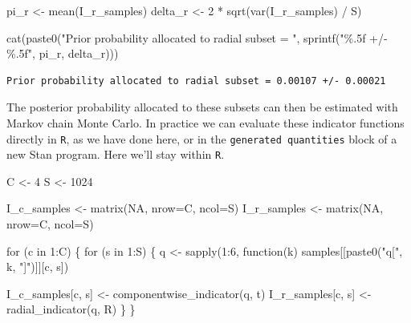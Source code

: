 \documentclass[
  letterpaper,
  DIV=11,
  numbers=noendperiod]{scrartcl}
\newenvironment{Shaded}{\begin{snugshade}}{\end{snugshade}}
\newcommand{\AttributeTok}[1]{\textcolor[rgb]{0.40,0.45,0.13}{#1}}
\newcommand{\ConstantTok}[1]{\textcolor[rgb]{0.56,0.35,0.01}{#1}}
\newcommand{\ControlFlowTok}[1]{\textcolor[rgb]{0.00,0.23,0.31}{#1}}
\newcommand{\DecValTok}[1]{\textcolor[rgb]{0.68,0.00,0.00}{#1}}
\newcommand{\FunctionTok}[1]{\textcolor[rgb]{0.28,0.35,0.67}{#1}}
\newcommand{\NormalTok}[1]{\textcolor[rgb]{0.00,0.23,0.31}{#1}}
\newcommand{\OtherTok}[1]{\textcolor[rgb]{0.00,0.23,0.31}{#1}}
\newcommand{\SpecialCharTok}[1]{\textcolor[rgb]{0.37,0.37,0.37}{#1}}
\newcommand{\StringTok}[1]{\textcolor[rgb]{0.13,0.47,0.30}{#1}}
\begin{document}
\begin{Shaded}
\begin{Highlighting}[]
\NormalTok{pi\_r }\OtherTok{\textless{}{-}} \FunctionTok{mean}\NormalTok{(I\_r\_samples)}
\NormalTok{delta\_r }\OtherTok{\textless{}{-}} \DecValTok{2} \SpecialCharTok{*} \FunctionTok{sqrt}\NormalTok{(}\FunctionTok{var}\NormalTok{(I\_r\_samples) }\SpecialCharTok{/}\NormalTok{ S)}

\FunctionTok{cat}\NormalTok{(}\FunctionTok{paste0}\NormalTok{(}\StringTok{"Prior probability allocated to radial subset = "}\NormalTok{,}
           \FunctionTok{sprintf}\NormalTok{(}\StringTok{"\%.5f +/{-} \%.5f"}\NormalTok{, pi\_r, delta\_r)))}
\end{Highlighting}
\end{Shaded}

\begin{verbatim}
Prior probability allocated to radial subset = 0.00107 +/- 0.00021
\end{verbatim}

The posterior probability allocated to these subsets can then be
estimated with Markov chain Monte Carlo. In practice we can evaluate
these indicator functions directly in \texttt{R}, as we have done here,
or in the \texttt{generated\ quantities} block of a new Stan program.
Here we'll stay within \texttt{R}.

\begin{Shaded}
\begin{Highlighting}[]
\NormalTok{C }\OtherTok{\textless{}{-}} \DecValTok{4}
\NormalTok{S }\OtherTok{\textless{}{-}} \DecValTok{1024}

\NormalTok{I\_c\_samples }\OtherTok{\textless{}{-}} \FunctionTok{matrix}\NormalTok{(}\ConstantTok{NA}\NormalTok{, }\AttributeTok{nrow=}\NormalTok{C, }\AttributeTok{ncol=}\NormalTok{S)}
\NormalTok{I\_r\_samples }\OtherTok{\textless{}{-}} \FunctionTok{matrix}\NormalTok{(}\ConstantTok{NA}\NormalTok{, }\AttributeTok{nrow=}\NormalTok{C, }\AttributeTok{ncol=}\NormalTok{S)}

\ControlFlowTok{for}\NormalTok{ (c }\ControlFlowTok{in} \DecValTok{1}\SpecialCharTok{:}\NormalTok{C) \{}
  \ControlFlowTok{for}\NormalTok{ (s }\ControlFlowTok{in} \DecValTok{1}\SpecialCharTok{:}\NormalTok{S) \{}
\NormalTok{    q }\OtherTok{\textless{}{-}} \FunctionTok{sapply}\NormalTok{(}\DecValTok{1}\SpecialCharTok{:}\DecValTok{6}\NormalTok{, }\ControlFlowTok{function}\NormalTok{(k)}
\NormalTok{                     samples[[}\FunctionTok{paste0}\NormalTok{(}\StringTok{"q["}\NormalTok{, k, }\StringTok{"]"}\NormalTok{)]][c, s])}

\NormalTok{    I\_c\_samples[c, s] }\OtherTok{\textless{}{-}} \FunctionTok{componentwise\_indicator}\NormalTok{(q, t)}
\NormalTok{    I\_r\_samples[c, s] }\OtherTok{\textless{}{-}} \FunctionTok{radial\_indicator}\NormalTok{(q, R)}
\NormalTok{  \}}
\NormalTok{\}}
\end{Highlighting}
\end{Shaded}
\end{document}
